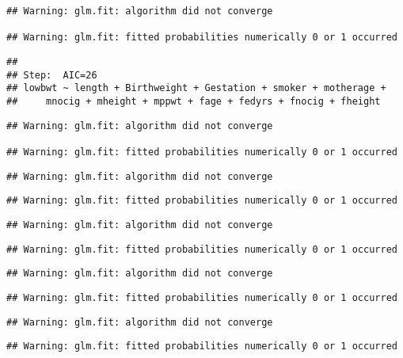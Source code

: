 \documentclass[]{article}
\begin{document}
\begin{verbatim}
## Warning: glm.fit: algorithm did not converge

## Warning: glm.fit: fitted probabilities numerically 0 or 1 occurred
\end{verbatim}

\begin{verbatim}
## 
## Step:  AIC=26
## lowbwt ~ length + Birthweight + Gestation + smoker + motherage + 
##     mnocig + mheight + mppwt + fage + fedyrs + fnocig + fheight
\end{verbatim}

\begin{verbatim}
## Warning: glm.fit: algorithm did not converge

## Warning: glm.fit: fitted probabilities numerically 0 or 1 occurred
\end{verbatim}

\begin{verbatim}
## Warning: glm.fit: algorithm did not converge
\end{verbatim}

\begin{verbatim}
## Warning: glm.fit: fitted probabilities numerically 0 or 1 occurred
\end{verbatim}

\begin{verbatim}
## Warning: glm.fit: algorithm did not converge
\end{verbatim}

\begin{verbatim}
## Warning: glm.fit: fitted probabilities numerically 0 or 1 occurred
\end{verbatim}

\begin{verbatim}
## Warning: glm.fit: algorithm did not converge
\end{verbatim}

\begin{verbatim}
## Warning: glm.fit: fitted probabilities numerically 0 or 1 occurred
\end{verbatim}

\begin{verbatim}
## Warning: glm.fit: algorithm did not converge
\end{verbatim}

\begin{verbatim}
## Warning: glm.fit: fitted probabilities numerically 0 or 1 occurred
\end{verbatim}
\end{document}
